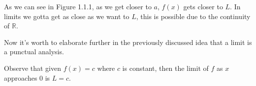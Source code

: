 \documentclass{report}
\begin{document}
As we can see in Figure 1.1.1, as we get closer to $a$, $f(x)$ gets closer to $L$. In limits we gotta get as close as we want to $L$, this is possible due to the continuity of $\mathbb{R}$.

Now it's worth to elaborate further in the previously discussed idea that a limit is a punctual analysis.

\begin{Example}
    Observe that given $f(x) = c$ where $c$ is constant, then the limit of $f$ as $x$ approaches $0$ is $L = c$.

    \begin{Figure}
        \begin{center}
            \begin{tikzpicture}[x=0.75pt,y=0.75pt,yscale=-1,xscale=1]
    

\end{tikzpicture}
\end{center}
\end{Figure}
\end{Example}
\end{document}
